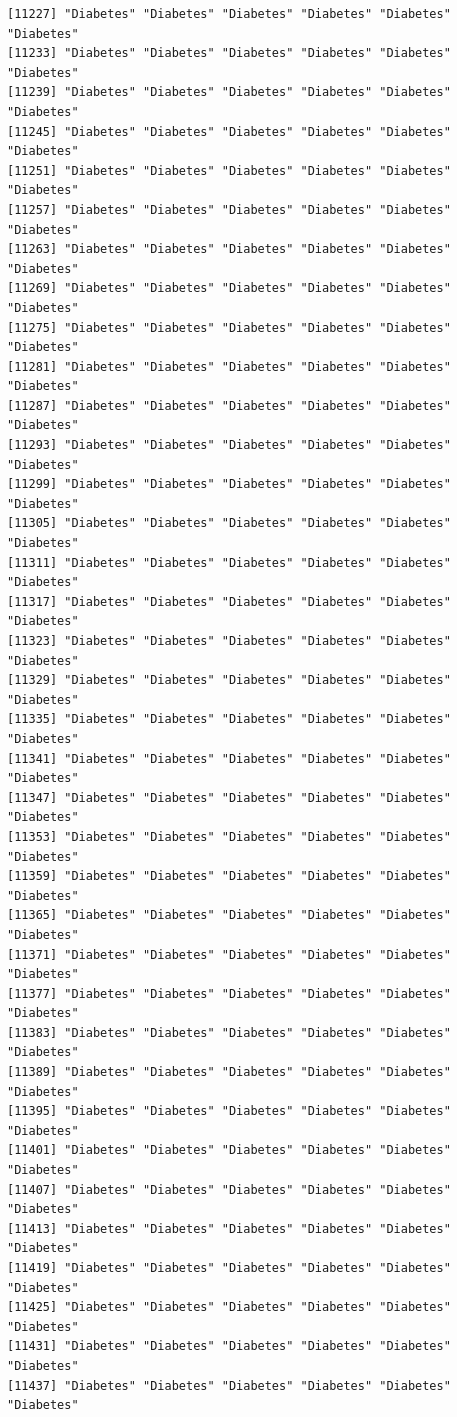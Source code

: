 \documentclass[
  letterpaper,
  DIV=11,
  numbers=noendperiod]{scrartcl}
\begin{document}
\begin{verbatim}
[11227] "Diabetes" "Diabetes" "Diabetes" "Diabetes" "Diabetes" "Diabetes"
[11233] "Diabetes" "Diabetes" "Diabetes" "Diabetes" "Diabetes" "Diabetes"
[11239] "Diabetes" "Diabetes" "Diabetes" "Diabetes" "Diabetes" "Diabetes"
[11245] "Diabetes" "Diabetes" "Diabetes" "Diabetes" "Diabetes" "Diabetes"
[11251] "Diabetes" "Diabetes" "Diabetes" "Diabetes" "Diabetes" "Diabetes"
[11257] "Diabetes" "Diabetes" "Diabetes" "Diabetes" "Diabetes" "Diabetes"
[11263] "Diabetes" "Diabetes" "Diabetes" "Diabetes" "Diabetes" "Diabetes"
[11269] "Diabetes" "Diabetes" "Diabetes" "Diabetes" "Diabetes" "Diabetes"
[11275] "Diabetes" "Diabetes" "Diabetes" "Diabetes" "Diabetes" "Diabetes"
[11281] "Diabetes" "Diabetes" "Diabetes" "Diabetes" "Diabetes" "Diabetes"
[11287] "Diabetes" "Diabetes" "Diabetes" "Diabetes" "Diabetes" "Diabetes"
[11293] "Diabetes" "Diabetes" "Diabetes" "Diabetes" "Diabetes" "Diabetes"
[11299] "Diabetes" "Diabetes" "Diabetes" "Diabetes" "Diabetes" "Diabetes"
[11305] "Diabetes" "Diabetes" "Diabetes" "Diabetes" "Diabetes" "Diabetes"
[11311] "Diabetes" "Diabetes" "Diabetes" "Diabetes" "Diabetes" "Diabetes"
[11317] "Diabetes" "Diabetes" "Diabetes" "Diabetes" "Diabetes" "Diabetes"
[11323] "Diabetes" "Diabetes" "Diabetes" "Diabetes" "Diabetes" "Diabetes"
[11329] "Diabetes" "Diabetes" "Diabetes" "Diabetes" "Diabetes" "Diabetes"
[11335] "Diabetes" "Diabetes" "Diabetes" "Diabetes" "Diabetes" "Diabetes"
[11341] "Diabetes" "Diabetes" "Diabetes" "Diabetes" "Diabetes" "Diabetes"
[11347] "Diabetes" "Diabetes" "Diabetes" "Diabetes" "Diabetes" "Diabetes"
[11353] "Diabetes" "Diabetes" "Diabetes" "Diabetes" "Diabetes" "Diabetes"
[11359] "Diabetes" "Diabetes" "Diabetes" "Diabetes" "Diabetes" "Diabetes"
[11365] "Diabetes" "Diabetes" "Diabetes" "Diabetes" "Diabetes" "Diabetes"
[11371] "Diabetes" "Diabetes" "Diabetes" "Diabetes" "Diabetes" "Diabetes"
[11377] "Diabetes" "Diabetes" "Diabetes" "Diabetes" "Diabetes" "Diabetes"
[11383] "Diabetes" "Diabetes" "Diabetes" "Diabetes" "Diabetes" "Diabetes"
[11389] "Diabetes" "Diabetes" "Diabetes" "Diabetes" "Diabetes" "Diabetes"
[11395] "Diabetes" "Diabetes" "Diabetes" "Diabetes" "Diabetes" "Diabetes"
[11401] "Diabetes" "Diabetes" "Diabetes" "Diabetes" "Diabetes" "Diabetes"
[11407] "Diabetes" "Diabetes" "Diabetes" "Diabetes" "Diabetes" "Diabetes"
[11413] "Diabetes" "Diabetes" "Diabetes" "Diabetes" "Diabetes" "Diabetes"
[11419] "Diabetes" "Diabetes" "Diabetes" "Diabetes" "Diabetes" "Diabetes"
[11425] "Diabetes" "Diabetes" "Diabetes" "Diabetes" "Diabetes" "Diabetes"
[11431] "Diabetes" "Diabetes" "Diabetes" "Diabetes" "Diabetes" "Diabetes"
[11437] "Diabetes" "Diabetes" "Diabetes" "Diabetes" "Diabetes" "Diabetes"

\end{verbatim}
\end{document}

